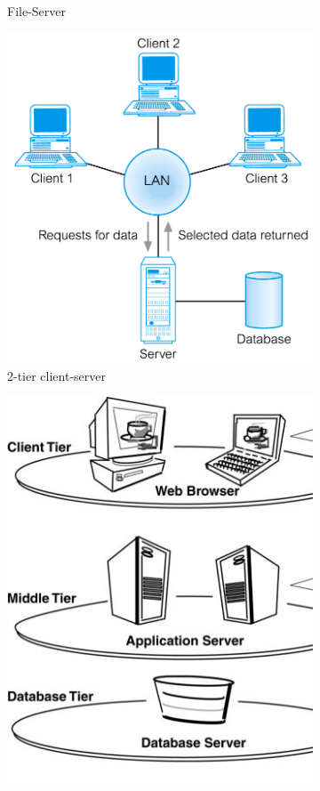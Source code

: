 \documentclass[a4paper,12pt]{article}
\begin{document}
\begin{figure}[H]
\begin{subfigure}{.49\textwidth}
  \caption{File-Server}
  \label{fig:FileServer}
\end{subfigure}
\begin{subfigure}{.49\textwidth}
  \centering
  \includegraphics[width=.9\linewidth]{img/Tier2Server.png}
  \caption{2-tier client-server}
  \label{fig:Tier2Server}
\end{subfigure}
\begin{subfigure}{.49\textwidth}
  \centering
  \includegraphics[width=.9\linewidth]{img/Tier3Server.png}

\end{subfigure}
\end{figure}
\end{document}

